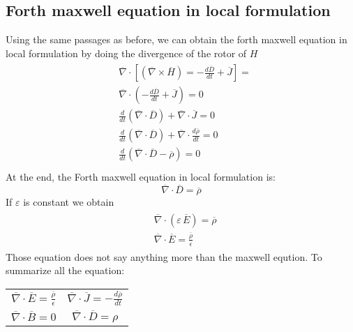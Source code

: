 \subsection*{Forth maxwell equation in local formulation}
Using the same passages as before, we can obtain the forth maxwell equation in local formulation by doing the divergence of the rotor of $H$
\begin{align}
    \begin{split}
        &\overline{\nabla} \cdot \left[ (\overline{\nabla}\times \overline{H})=-\frac{d\overline{D}}{dt}+\overline{J}\right]=\\[5pt]
        &\overline{\nabla} \cdot \left(-\frac{d\overline{D}}{dt}+\overline{J}\right)=0\\[5pt]
        &\frac{d}{dt}(\overline{\nabla}\cdot \overline{D})+\overline{\nabla}\cdot \overline{J}=0\\[5pt]
        &\frac{d}{dt}(\overline{\nabla}\cdot \overline{D})+\overline{\nabla}\cdot \frac{d\overline\rho}{dt}=0\\[5pt]
        &\frac{d}{dt}\left(\overline{\nabla}\cdot\overline{D}-\overline{\rho}\right)=0\\[5pt]
    \end{split}
\end{align}
At the end, the Forth maxwell equation in local formulation is:
\begin{equation}
    \overline{\nabla}\cdot\overline{D}=\overline{\rho}
\end{equation}
If $\varepsilon$ is constant we obtain
\begin{align}
    \begin{split}
        &\overline{\nabla}\cdot(\varepsilon\,\overline{E})=\overline{\rho}\\[5pt]
        &\overline{\nabla}\cdot\overline{E}=\frac{\overline{\rho}}{\epsilon}
    \end{split}
\end{align}
Those equation does not say anything more than the maxwell eqution.
To summarize all the equation:
\begin{center}
\begin{tabular}{ c c }
    $\overline{\nabla}\cdot\overline{E}=\frac{\overline{\rho}}{\epsilon}$&$\overline{\nabla}\cdot\overline{J}=-\frac{d\overline{\rho}}{dt}$\\[5pt]
    $\overline{\nabla}\cdot\overline{B}=0$&$\overline{\nabla}\cdot\overline{D}=\rho$
\end{tabular}
\end{center}